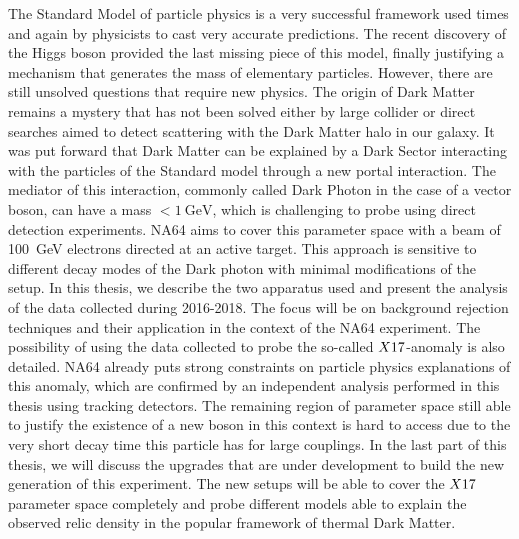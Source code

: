 The Standard Model of particle physics is a very successful framework used times and again by physicists to cast very accurate predictions. The recent discovery of the Higgs boson provided the last missing piece of this model, finally justifying a mechanism that generates the mass of elementary particles. However, there are still unsolved questions that require new physics. The origin of Dark Matter remains a mystery that has not been solved either by large collider or direct searches aimed to detect scattering with the Dark Matter halo in our galaxy.  It was put forward that Dark Matter can be explained by a Dark Sector interacting with the particles of the Standard model through a new portal interaction. The mediator of this interaction, commonly called Dark Photon in the case of a vector boson, can have a mass $< \SI{1}{\giga\electronvolt}$, which is challenging to probe using direct detection experiments. NA64 aims to cover this parameter space with a beam of \SI{100}{\giga\electronvolt} electrons directed at an active target. This approach is sensitive to different decay modes of the Dark photon with minimal modifications of the setup. In this thesis, we describe the two apparatus used and present the analysis of the data collected during 2016-2018. The focus will be on background rejection techniques and their application in the context of the NA64 experiment. The possibility of using the data collected to probe the so-called $X17$-anomaly is also detailed. NA64 already puts strong constraints on particle physics explanations of this anomaly, which are confirmed by an independent analysis performed in this thesis using tracking detectors. The remaining region of parameter space still able to justify the existence of a new boson in this context is hard to access due to the very short decay time this particle has for large couplings. In the last part of this thesis, we will discuss the upgrades that are under development to build the new generation of this experiment. The new setups will be able to cover the $X17$ parameter space completely and probe different models able to explain the observed relic density in the popular framework of thermal Dark Matter.
